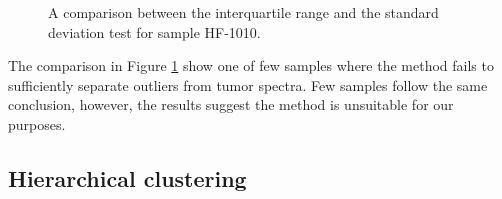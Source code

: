 \begin{figure}[h]

    \centering
    \qquad
    \caption{A comparison between the interquartile range and the standard deviation test for sample HF-1010.
\label{fig:HF1010comp}}%
\end{figure}

The comparison in Figure \ref{fig:HF1010comp} show one of few samples where the method fails to sufficiently separate outliers from tumor spectra. Few samples follow the same conclusion, however, the results suggest the method is unsuitable for our purposes. 

\subsection{Hierarchical clustering}


